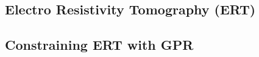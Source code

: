 \documentclass[5p]{elsarticle}
\newcommand{\COMON}{\begin{color}{blue}}
\newcommand{\COMOFF}{\end{color}}
\newcommand{\alon}{\begin{color}{red}}
\newcommand{\aloff}{\end{color}}
\begin{document}
												
												
		\subsection{Electro Resistivity Tomography (ERT)}

                


	
                \subsection{Constraining ERT with GPR}

										

									
\end{document}
